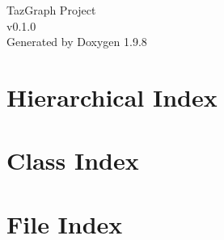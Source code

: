 \documentclass[twoside]{book}
\newcommand{\+}{\discretionary{\mbox{\scriptsize$\hookleftarrow$}}{}{}}
\newcommand{\clearemptydoublepage}{%
    \newpage{\pagestyle{empty}\cleardoublepage}%
  }
\begin{document}
  \raggedbottom
    \hypersetup{pageanchor=false,
                bookmarksnumbered=true,
                pdfencoding=unicode
               }
  \begin{titlepage}
  \vspace*{7cm}
  \begin{center}%
  {\Large Taz\+Graph Project}\\
  [1ex]\large v0.\+1.\+0 \\
  \vspace*{1cm}
  {\large Generated by Doxygen 1.9.8}\\
  \end{center}
  \end{titlepage}
  \clearemptydoublepage
  \tableofcontents
  \clearemptydoublepage
  \hypersetup{pageanchor=true}



\chapter{Hierarchical Index}

\chapter{Class Index}

\chapter{File Index}

\end{document}
